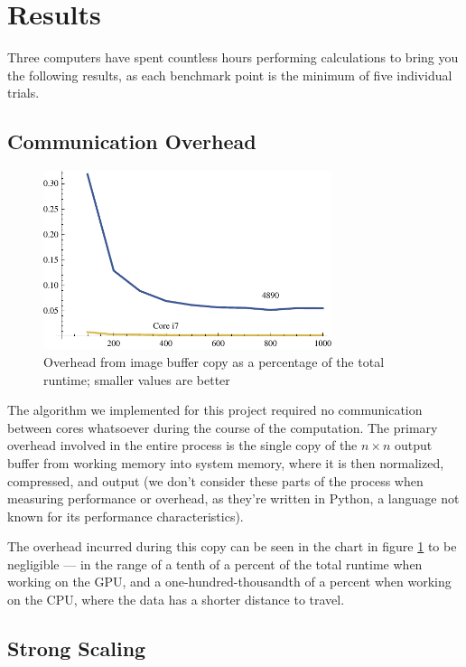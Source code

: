 \documentclass{acmsiggraph}
\begin{document}
\section{Results}

Three computers have spent countless hours performing calculations to bring you the following results, as each benchmark point is the minimum of five individual trials.

\subsection{Communication Overhead}

\begin{figure}
    \includegraphics[width=84.5mm]{overheadPlot.pdf}
    \caption{Overhead from image buffer copy as a percentage of the total runtime; smaller values are better}
    \label{fig:overheadPlot}
\end{figure}

The algorithm we implemented for this project required no communication between  cores whatsoever during the course of the computation. The primary overhead involved in the entire process is the single copy of the $n\times n$ output buffer from working memory into system memory, where it is then normalized, compressed, and output (we don't consider these parts of the process when measuring performance or overhead, as they're written in Python, a language not known for its performance characteristics).

The overhead incurred during this copy can be seen in the chart in figure \ref{fig:overheadPlot} to be negligible --- in the range of a tenth of a percent of the total runtime when working on the GPU, and a one-hundred-thousandth of a percent when working on the CPU, where the data has a shorter distance to travel.

\subsection{Strong Scaling}
\end{document}
